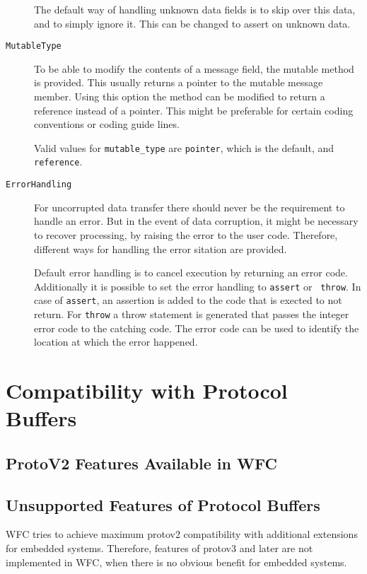 \documentclass[12pt]{article}
\begin{document}
\begin{description}
	The default way of handling unknown data fields is to skip over this
		data, and to simply ignore it. This can be changed to assert on
		unknown data.

\item[{\tt MutableType}]
	To be able to modify the contents of a message field, the mutable
		method is provided. This usually returns a pointer to the
		mutable message member. Using this option the method can be
		modified to return a reference instead of a pointer. This might
		be preferable for certain coding conventions or coding guide
		lines.
	
	Valid values for {\tt mutable\_type} are {\tt pointer}, which is the
		default, and {\tt reference}.

\item[{\tt ErrorHandling}]
	For uncorrupted data transfer there should never be the requirement to
		handle an error. But in the event of data corruption, it might
		be necessary to recover processing, by raising the error to the
		user code. Therefore, different ways for handling the error
		sitation are provided.

Default error handling is to cancel execution by returning an error code.
Additionally it is possible to set the error handling to {\tt assert} or {\tt
throw}. In case of {\tt assert}, an assertion is added to the code that is
exected to not return. For {\tt throw} a throw statement is generated that
passes the integer error code to the catching code. The error code can be used
to identify the location at which the error happened.

\end{description}

\section{Compatibility with Protocol Buffers}
\subsection{ProtoV2 Features Available in WFC}
\subsection{Unsupported Features of Protocol Buffers}
WFC tries to achieve maximum protov2 compatibility with additional extensions
for embedded systems. Therefore, features of protov3 and later are not
implemented in WFC, when there is no obvious benefit for embedded systems.
\end{document}
